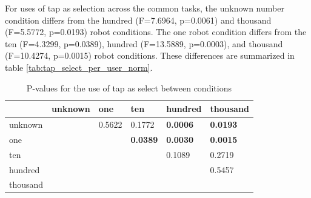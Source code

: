 %

For uses of tap as selection across the common tasks, the unknown number condition differs from the hundred (F=7.6964, p=0.0061) and thousand (F=5.5772, p=0.0193) robot conditions. 
The one robot condition differs from the ten (F=4.3299, p=0.0389), hundred (F=13.5889, p=0.0003), and thousand (F=10.4274, p=0.0015) robot conditions.
These differences are summarized in table \ref{tab:tap_select_per_user_norm}.

\begin{table}
	\begin{tabular}{l|l l l l l}
		& unknown & one    & ten        & hundred     & thousand   \\ 
		\hline
		unknown & & 0.5622 & 0.1772 & \textbf{0.0006} & \textbf{0.0193} \\   
		one & & & \textbf{0.0389} & \textbf{0.0030} & \textbf{0.0015} \\
		ten & & & & 0.1089 & 0.2719   \\
		hundred & & & & & 0.5457   \\
		thousand & & & & &\\
	\end{tabular}
	\caption{P-values for the use of tap as select between conditions}
	\label{tab:tap_select_per_task_norm}
\end{table}

